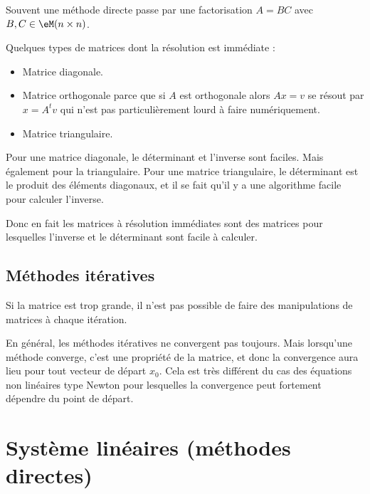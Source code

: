 Souvent une méthode directe passe par une factorisation \( A=BC\) avec \( B,C\in \eM(n\times n)\).

Quelques types de matrices dont la résolution est immédiate :
\begin{itemize}
	\item Matrice diagonale.
	\item Matrice orthogonale parce que si \( A\) est orthogonale alors \( Ax=v\) se résout par \( x=A^tv\) qui n'est pas particulièrement lourd à faire numériquement.
	\item Matrice triangulaire.
\end{itemize}

\begin{remark}
	Pour une matrice diagonale, le déterminant et l'inverse sont faciles. Mais également pour la triangulaire. Pour une matrice triangulaire, le déterminant est le produit des éléments diagonaux, et il se fait qu'il y a une algorithme facile pour calculer l'inverse.

	Donc en fait les matrices à résolution immédiates sont des matrices pour lesquelles l'inverse et le déterminant sont facile à calculer.
\end{remark}

\subsection{Méthodes itératives}

Si la matrice est trop grande, il n'est pas possible de faire des manipulations de matrices à chaque itération.

En général, les méthodes itératives ne convergent pas toujours. Mais lorsqu'une méthode converge, c'est une propriété de la matrice, et donc la convergence aura lieu pour tout vecteur de départ \( x_0\). Cela est très différent du cas des équations non linéaires type Newton pour lesquelles la convergence peut fortement dépendre du point de départ.

\section{Système linéaires (méthodes directes)}

